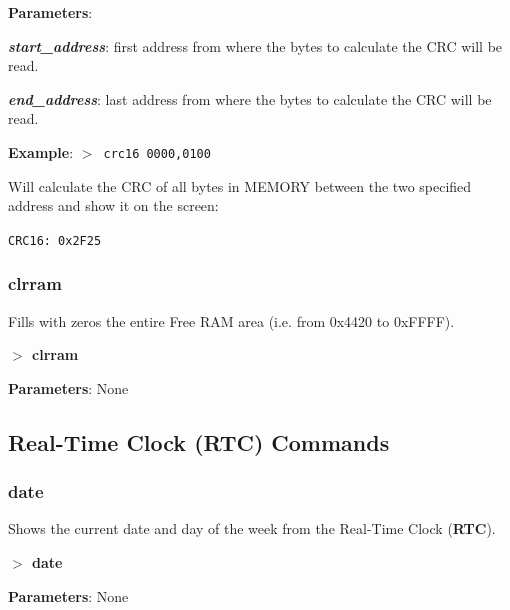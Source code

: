 \documentclass[a4paper,11pt]{article}
\begin{document}
        \textbf{Parameters}:

        \hspace{1cm}\textbf{\textit{start\_address}}: first address from
        where the bytes to calculate the CRC will be read.

        \hspace{1cm}\textbf{\textit{end\_address}}: last address from where
        the bytes to calculate the CRC will be read.

        \textbf{Example}: \texttt{$>$ crc16 0000,0100}

        Will calculate the CRC of all bytes in MEMORY between the two
        specified address and show it on the screen:
        
        \hspace{1cm}\texttt{CRC16:\ 0x2F25}

        \subsubsection{{\color{blue}clrram}}
        Fills with zeros the entire Free RAM area (i.e. from 0x4420 to
        0xFFFF).

        \hspace{1.9cm}\textbf{$>$ clrram}

        \textbf{Parameters}: None

    \subsection{Real-Time Clock (RTC) Commands}
        \subsubsection{{\color{blue}date}}
        Shows the current date and day of the week from the Real-Time Clock
        (\textbf{RTC}).

        \hspace{1.9cm}\textbf{$>$ date}

        \textbf{Parameters}: None
\end{document}

